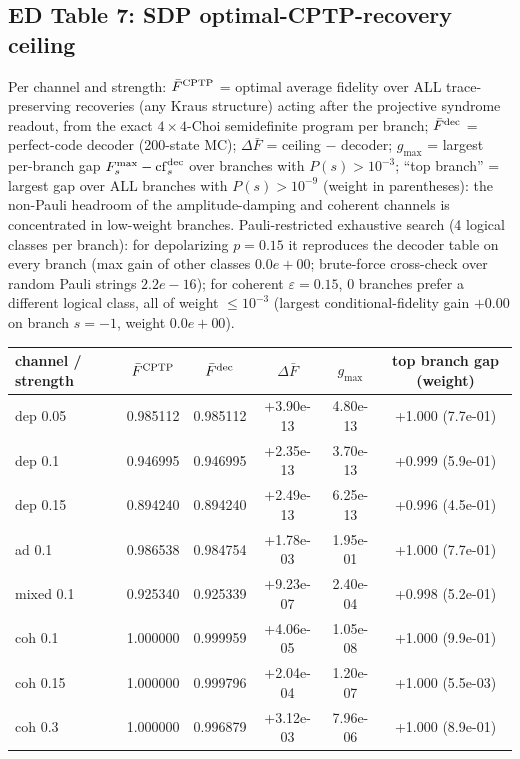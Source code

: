 \documentclass[10pt,a4paper]{article}
\begin{document}
\subsection*{ED Table 7: SDP optimal-CPTP-recovery ceiling}
Per channel and strength: $\bar F^{\rm CPTP}$ = optimal average fidelity
over ALL trace-preserving recoveries (any Kraus structure) acting after the
projective syndrome readout, from the exact $4\times4$-Choi semidefinite
program per branch; $\bar F^{\rm dec}$ = perfect-code decoder (200-state
MC); $\Delta\bar F$ = ceiling $-$ decoder; $g_{\max}$ = largest per-branch
gap $F_s^{\max}-\mathrm{cf}_s^{\rm dec}$ over branches with $P(s)>10^{-3}$;
``top branch'' = largest gap over ALL branches with $P(s)>10^{-9}$ (weight
in parentheses): the non-Pauli headroom of the amplitude-damping and
coherent channels is concentrated in low-weight branches.
Pauli-restricted exhaustive search (4 logical classes per branch): for
depolarizing $p=0.15$ it reproduces the decoder table on every branch (max
gain of other classes $0.0e+00$; brute-force cross-check over random Pauli
strings $2.2e-16$); for coherent $\varepsilon=0.15$, 0 branches prefer a
different logical class, all of weight $\le10^{-3}$ (largest
conditional-fidelity gain $+0.00$ on branch $s=-1$, weight $0.0e+00$).
\begin{longtable}{lccccc}
\toprule channel / strength & $\bar F^{\rm CPTP}$ & $\bar F^{\rm dec}$ & $\Delta\bar F$ & $g_{\max}$ & top branch gap (weight) \\ \midrule
dep 0.05 & 0.985112 & 0.985112 & +3.90e-13 & 4.80e-13 & +1.000 (7.7e-01) \\
dep 0.1 & 0.946995 & 0.946995 & +2.35e-13 & 3.70e-13 & +0.999 (5.9e-01) \\
dep 0.15 & 0.894240 & 0.894240 & +2.49e-13 & 6.25e-13 & +0.996 (4.5e-01) \\
ad 0.1 & 0.986538 & 0.984754 & +1.78e-03 & 1.95e-01 & +1.000 (7.7e-01) \\
mixed 0.1 & 0.925340 & 0.925339 & +9.23e-07 & 2.40e-04 & +0.998 (5.2e-01) \\
coh 0.1 & 1.000000 & 0.999959 & +4.06e-05 & 1.05e-08 & +1.000 (9.9e-01) \\
coh 0.15 & 1.000000 & 0.999796 & +2.04e-04 & 1.20e-07 & +1.000 (5.5e-03) \\
coh 0.3 & 1.000000 & 0.996879 & +3.12e-03 & 7.96e-06 & +1.000 (8.9e-01) \\
\bottomrule\end{longtable}
\end{document}
